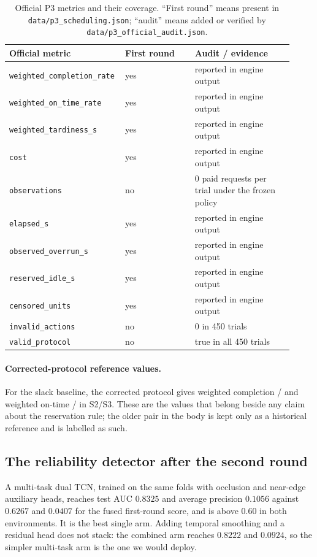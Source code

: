 \begin{table}[H]\centering\scriptsize
\caption{Official P3 metrics and their coverage. ``First round'' means present in \texttt{data/p3\_scheduling.json}; ``audit'' means added or verified by \texttt{data/p3\_official\_audit.json}.}
\label{tab:appL-p3}
\begin{tabular}{p{0.34\linewidth}p{0.24\linewidth}p{0.34\linewidth}}
\toprule
Official metric & First round & Audit / evidence \\
\midrule
\texttt{weighted\_completion\_rate} & yes & reported in engine output \\
\texttt{weighted\_on\_time\_rate} & yes & reported in engine output \\
\texttt{weighted\_tardiness\_s} & yes & reported in engine output \\
\texttt{cost} & yes & reported in engine output \\
\texttt{observations} & no & 0 paid requests per trial under the frozen policy \\
\texttt{elapsed\_s} & yes & reported in engine output \\
\texttt{observed\_overrun\_s} & yes & reported in engine output \\
\texttt{reserved\_idle\_s} & yes & reported in engine output \\
\texttt{censored\_units} & yes & reported in engine output \\
\texttt{invalid\_actions} & no & 0 in 450 trials \\
\texttt{valid\_protocol} & no & true in all 450 trials \\
\bottomrule\end{tabular}\end{table}

\paragraph{Corrected-protocol reference values.} For the slack baseline, the
corrected protocol gives weighted completion \slotPStochSTwoSlackOldComp{}/\slotPStochSThreeSlackOldComp{}
and weighted on-time \slotPStochSTwoSlackOldETA{}/\slotPStochSThreeSlackOldETA{} in S2/S3. These
are the values that belong beside any claim about the reservation rule; the older
pair in the body is kept only as a historical reference and is labelled as such.

\subsection*{The reliability detector after the second round}
A multi-task dual TCN, trained on the same folds with occlusion and near-edge
auxiliary heads, reaches test AUC $0.8325$ and average precision $0.1056$ against
$0.6267$ and $0.0407$ for the fused first-round score, and is above $0.60$ in both
environments. It is the best single arm. Adding temporal smoothing and a residual
head does not stack: the combined arm reaches $0.8222$ and $0.0924$, so the
simpler multi-task arm is the one we would deploy.

